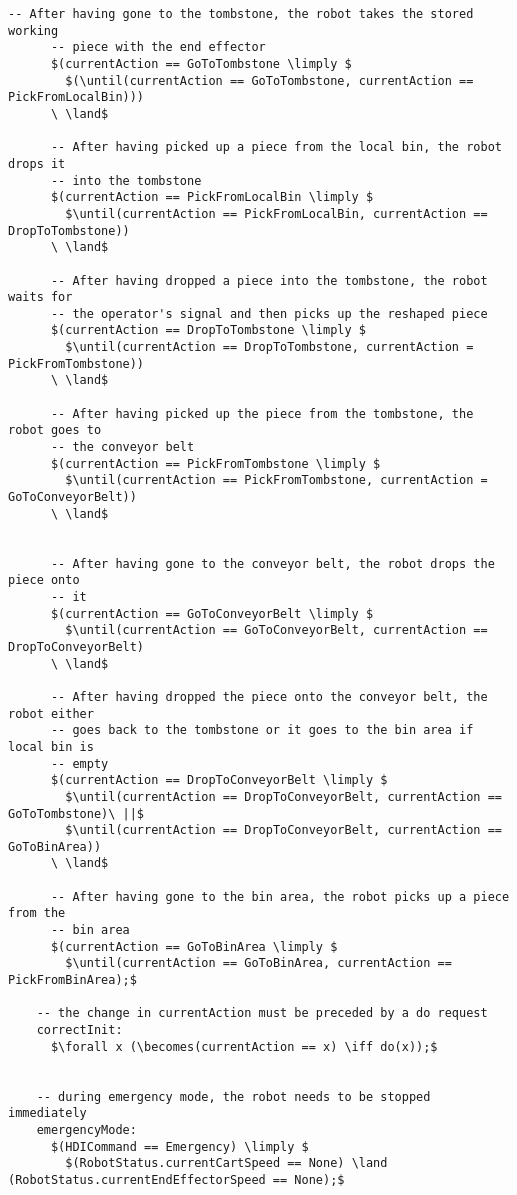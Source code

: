 \begin{lstlisting}[fontadjust, mathescape, frame=single]
      -- After having gone to the tombstone, the robot takes the stored working 
      -- piece with the end effector
      $(currentAction == GoToTombstone \limply $
        $(\until(currentAction == GoToTombstone, currentAction == PickFromLocalBin)))
      \ \land$

      -- After having picked up a piece from the local bin, the robot drops it 
      -- into the tombstone
      $(currentAction == PickFromLocalBin \limply $
        $\until(currentAction == PickFromLocalBin, currentAction == DropToTombstone))
      \ \land$

      -- After having dropped a piece into the tombstone, the robot waits for  
      -- the operator's signal and then picks up the reshaped piece
      $(currentAction == DropToTombstone \limply $ 
        $\until(currentAction == DropToTombstone, currentAction = PickFromTombstone))
      \ \land$

      -- After having picked up the piece from the tombstone, the robot goes to
      -- the conveyor belt
      $(currentAction == PickFromTombstone \limply $
        $\until(currentAction == PickFromTombstone, currentAction = GoToConveyorBelt))
      \ \land$


      -- After having gone to the conveyor belt, the robot drops the piece onto
      -- it
      $(currentAction == GoToConveyorBelt \limply $
        $\until(currentAction == GoToConveyorBelt, currentAction == DropToConveyorBelt)
      \ \land$

      -- After having dropped the piece onto the conveyor belt, the robot either 
      -- goes back to the tombstone or it goes to the bin area if local bin is 
      -- empty
      $(currentAction == DropToConveyorBelt \limply $
        $\until(currentAction == DropToConveyorBelt, currentAction == GoToTombstone)\ ||$
        $\until(currentAction == DropToConveyorBelt, currentAction == GoToBinArea))
      \ \land$

      -- After having gone to the bin area, the robot picks up a piece from the 
      -- bin area
      $(currentAction == GoToBinArea \limply $
        $\until(currentAction == GoToBinArea, currentAction == PickFromBinArea);$

    -- the change in currentAction must be preceded by a do request
    correctInit:
      $\forall x (\becomes(currentAction == x) \iff do(x));$

    
    -- during emergency mode, the robot needs to be stopped immediately
    emergencyMode:
      $(HDICommand == Emergency) \limply $
        $(RobotStatus.currentCartSpeed == None) \land (RobotStatus.currentEndEffectorSpeed == None);$


\end{lstlisting}
